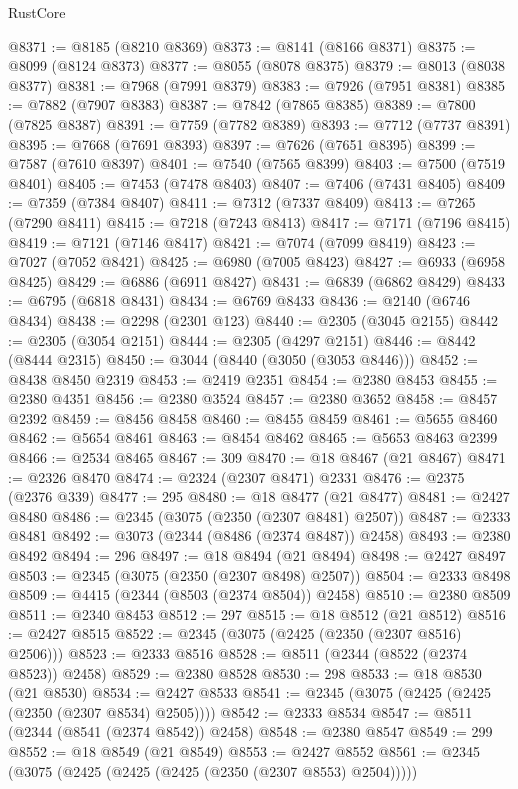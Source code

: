 \begin{lexlean}{RustCore}
\begin{coremodule}
@8371 := @8185 (@8210 @8369)
@8373 := @8141 (@8166 @8371)
@8375 := @8099 (@8124 @8373)
@8377 := @8055 (@8078 @8375)
@8379 := @8013 (@8038 @8377)
@8381 := @7968 (@7991 @8379)
@8383 := @7926 (@7951 @8381)
@8385 := @7882 (@7907 @8383)
@8387 := @7842 (@7865 @8385)
@8389 := @7800 (@7825 @8387)
@8391 := @7759 (@7782 @8389)
@8393 := @7712 (@7737 @8391)
@8395 := @7668 (@7691 @8393)
@8397 := @7626 (@7651 @8395)
@8399 := @7587 (@7610 @8397)
@8401 := @7540 (@7565 @8399)
@8403 := @7500 (@7519 @8401)
@8405 := @7453 (@7478 @8403)
@8407 := @7406 (@7431 @8405)
@8409 := @7359 (@7384 @8407)
@8411 := @7312 (@7337 @8409)
@8413 := @7265 (@7290 @8411)
@8415 := @7218 (@7243 @8413)
@8417 := @7171 (@7196 @8415)
@8419 := @7121 (@7146 @8417)
@8421 := @7074 (@7099 @8419)
@8423 := @7027 (@7052 @8421)
@8425 := @6980 (@7005 @8423)
@8427 := @6933 (@6958 @8425)
@8429 := @6886 (@6911 @8427)
@8431 := @6839 (@6862 @8429)
@8433 := @6795 (@6818 @8431)
@8434 := @6769 @8433
@8436 := @2140 (@6746 @8434)
@8438 := @2298 (@2301 @123)
@8440 := @2305 (@3045 @2155)
@8442 := @2305 (@3054 @2151)
@8444 := @2305 (@4297 @2151)
@8446 := @8442 (@8444 @2315)
@8450 := @3044 (@8440 (@3050 (@3053 @8446)))
@8452 := @8438 @8450 @2319
@8453 := @2419 @2351
@8454 := @2380 @8453
@8455 := @2380 @4351
@8456 := @2380 @3524
@8457 := @2380 @3652
@8458 := @8457 @2392
@8459 := @8456 @8458
@8460 := @8455 @8459
@8461 := @5655 @8460
@8462 := @5654 @8461
@8463 := @8454 @8462
@8465 := @5653 @8463 @2399
@8466 := @2534 @8465
@8467 := 309
@8470 := @18 @8467 (@21 @8467)
@8471 := @2326 @8470
@8474 := @2324 (@2307 @8471) @2331
@8476 := @2375 (@2376 @339)
@8477 := 295
@8480 := @18 @8477 (@21 @8477)
@8481 := @2427 @8480
@8486 := @2345 (@3075 (@2350 (@2307 @8481) @2507))
@8487 := @2333 @8481
@8492 := @3073 (@2344 (@8486 (@2374 @8487)) @2458)
@8493 := @2380 @8492
@8494 := 296
@8497 := @18 @8494 (@21 @8494)
@8498 := @2427 @8497
@8503 := @2345 (@3075 (@2350 (@2307 @8498) @2507))
@8504 := @2333 @8498
@8509 := @4415 (@2344 (@8503 (@2374 @8504)) @2458)
@8510 := @2380 @8509
@8511 := @2340 @8453
@8512 := 297
@8515 := @18 @8512 (@21 @8512)
@8516 := @2427 @8515
@8522 := @2345 (@3075 (@2425 (@2350 (@2307 @8516) @2506)))
@8523 := @2333 @8516
@8528 := @8511 (@2344 (@8522 (@2374 @8523)) @2458)
@8529 := @2380 @8528
@8530 := 298
@8533 := @18 @8530 (@21 @8530)
@8534 := @2427 @8533
@8541 := @2345 (@3075 (@2425 (@2425 (@2350 (@2307 @8534) @2505))))
@8542 := @2333 @8534
@8547 := @8511 (@2344 (@8541 (@2374 @8542)) @2458)
@8548 := @2380 @8547
@8549 := 299
@8552 := @18 @8549 (@21 @8549)
@8553 := @2427 @8552
@8561 := @2345 (@3075 (@2425 (@2425 (@2425 (@2350 (@2307 @8553) @2504)))))

\end{coremodule}
\end{lexlean}
